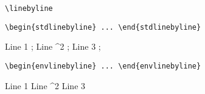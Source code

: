\documentclass{article}
\begin{document}
\verb#\linebyline#

\medskip



\bigskip


\verb#\begin{stdlinebyline} ... \end{stdlinebyline}#

\medskip

\begin{stdlinebyline}
	Line 1  ;
	Line ^2 ;
	Line 3  ;
\end{stdlinebyline}


\bigskip


\verb#\begin{envlinebyline} ... \end{envlinebyline}#

\medskip

\begin{envlinebyline}
	Line 1
	Line ^2
	Line 3
\end{envlinebyline}
\end{document}
